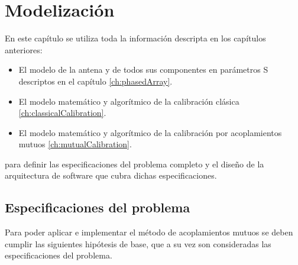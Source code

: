 \chapter{Modelización}
\label{ch:modelizacion}


En este capítulo se utiliza toda la información descripta en los capítulos anteriores:
\begin{itemize}
	\item El modelo de la antena y de todos sus componentes en parámetros S descriptos en el capítulo \ref{ch:phasedArray}.
	\item El modelo matemático y algorítmico de la calibración clásica \ref{ch:classicalCalibration}.
	\item El modelo matemático y algorítmico de la calibración por acoplamientos mutuos \ref{ch:mutualCalibration}.
\end{itemize}
para definir las especificaciones del problema completo y el diseño de la arquitectura de software que cubra dichas especificaciones. 


\section{Especificaciones del problema} \label{sc:specifications}

Para poder aplicar e implementar el método de acoplamientos mutuos se deben cumplir las siguientes hipótesis de base, que a su
vez son consideradas las especificaciones del problema.


